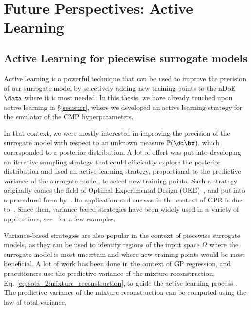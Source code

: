 %
\chapter{Future Perspectives: Active Learning}
\label{sec:al}


\section{Active Learning for piecewise surrogate models}
\label{sec:al:active_learning_piecewise}

Active learning is a powerful technique that can be used to improve the precision of our surrogate model by selectively adding new training points to the nDoE $\data$ where it is most needed. In this thesis, we have already touched upon active learning in \S\ref{sec:surr}, where we developed an active learning strategy for the emulator of the CMP hyperparameters.  

\smallskip
In that context, we were mostly interested in improving the precision of the surrogate model with respect to an unknown measure $\mathbb{P}(\dd \bx)$, which corresponded to a posterior distribution. A lot of effort was put into developing an iterative sampling strategy that could efficiently explore the posterior distribution and used an active learning strategy, proportional to the predictive variance of the surrogate model, to select new training points. Such a strategy originally comes the field of Optimal Experimental Design (OED)~\cite{kiefer1959,kiefer1960}, and put into a procedural form by~\cite{fedorov1972}. Its application and success in the context of GPR is due to~\cite{mackay1992}. Since then, variance based strategies have been widely used in a variety of applications, see~\cite{chen2026,tebbe2024} for a few examples. 

\smallskip
Variance-based strategies are also popular in the context of piecewise surrogate models, as they can be used to identify regions of the input space $\Omega$ where the surrogate model is most uncertain and where new training points would be most beneficial. A lot of work has been done in the context of GP regression, and practitioners use the predictive variance of the mixture reconstruction, Eq.~\eqref{eq:sota_2:mixture_reconstruction}, to guide the active learning process~\cite{riis2023, park2025}. The predictive variance of the mixture reconstruction can be computed using the law of total variance, 

